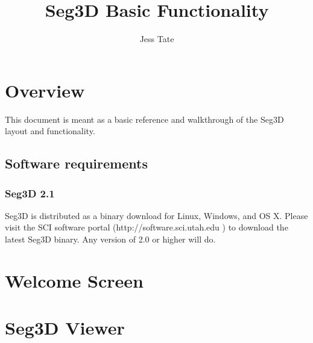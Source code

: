 \documentclass[fleqn,11pt,openany]{book}
\title{Seg3D Basic Functionality}
\author{Jess Tate}
\begin{document}




\chapter{Overview}

\begin{introduction}

This document is meant as a basic reference and walkthrough of the Seg3D layout and functionality.  

\end{introduction}

\section{Software requirements}

\subsection{Seg3D 2.1}

Seg3D is distributed as a binary download for Linux, Windows, and OS X. Please visit the SCI software portal ({http://software.sci.utah.edu} ) to download the latest Seg3D binary. Any version of 2.0 or higher will do. 



\chapter{Welcome Screen}


\chapter{Seg3D Viewer}
\end{document}
